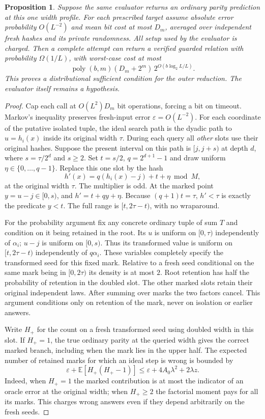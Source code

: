 \documentclass[11pt]{article}
\newtheorem{proposition}{Proposition}
\newcommand{\E}{\mathbb E}
\begin{document}
\begin{proposition}
Suppose the same evaluator returns an ordinary parity prediction
at this one width profile. For each prescribed target assume absolute
error probability $O(L^{-2})$ and mean bit cost at most $D_m$, averaged
over independent fresh hashes and its private randomness. All setup
used by the evaluator is charged. Then a complete attempt can return
a verified guarded relation with probability $\Omega(1/L)$, with
worst-case cost at most
\[
 \operatorname{poly}(b,m)(D_m+2^m)\,2^{O(b\log_2 L/L)} .
\]
This proves a distributional sufficient condition for the outer
reduction. The evaluator itself remains a hypothesis.
\end{proposition}
\begin{proof}
Cap each call at $O(L^2)D_m$ bit operations, forcing a bit on timeout.
Markov's inequality preserves fresh-input error $\varepsilon=O(L^{-2})$.
For each coordinate of the putative isolated tuple, the ideal search
path is the dyadic path to $u=h_i(x)$ inside its original width $\tau$.
During each query all \emph{other} slots use their original hashes.
Suppose the present interval on this path is $[j,j+s)$ at depth $d$,
where $s=\tau/2^d$ and $s\ge2$. Set $t=s/2$, $q=2^{d+1}-1$ and draw
uniform $\eta\in\{0,\ldots,q-1\}$. Replace this one slot by the hash
\[
                  h'(x)=q(h_i(x)-j)+t+\eta\bmod M ,
\]
at the original width $\tau$. The multiplier is odd. At the marked
point $y=u-j\in[0,s)$, and $h'=t+qy+\eta$. Because $(q+1)t=\tau$,
$h'<\tau$ is exactly the predicate $y<t$. The full range is
$[t,2\tau-t)$, with no wraparound.

For the probability argument fix any concrete ordinary tuple of sum $T$
and condition on it being retained in the root. Its $u$ is uniform on
$[0,\tau)$ independently of $\alpha_i$; $u-j$ is uniform on $[0,s)$.
Thus its transformed value is uniform on $[t,2\tau-t)$ independently
of $q\alpha_i$. These variables completely specify the transformed
seed for this fixed mark. Relative to a fresh seed conditional on the
same mark being in $[0,2\tau)$ its density is at most $2$. Root
retention has half the probability of retention in the doubled slot.
The other marked slots retain their original independent laws.
After summing over marks the two factors cancel. This argument conditions
only on retention of the mark, never on isolation or earlier answers.

Write $H_+$ for the count on a fresh transformed seed using doubled
width in this slot. If $H_+=1$, the true ordinary parity at the
queried width gives the correct marked branch, including when the mark
lies in the upper half. The expected number of retained marks for
which an ideal step is wrong is bounded by
\[
 \varepsilon+\E[H_+(H_+-1)]
       \le \varepsilon+4A_0\lambda^2+2\lambda z .
\]
Indeed, when $H_+=1$ the marked contribution is at most the indicator
of an oracle error at the original width; when $H_+\ge2$ the factorial
moment pays for all its marks. This charges wrong answers even if
they depend arbitrarily on the fresh seeds.


\end{proof}
\end{document}

